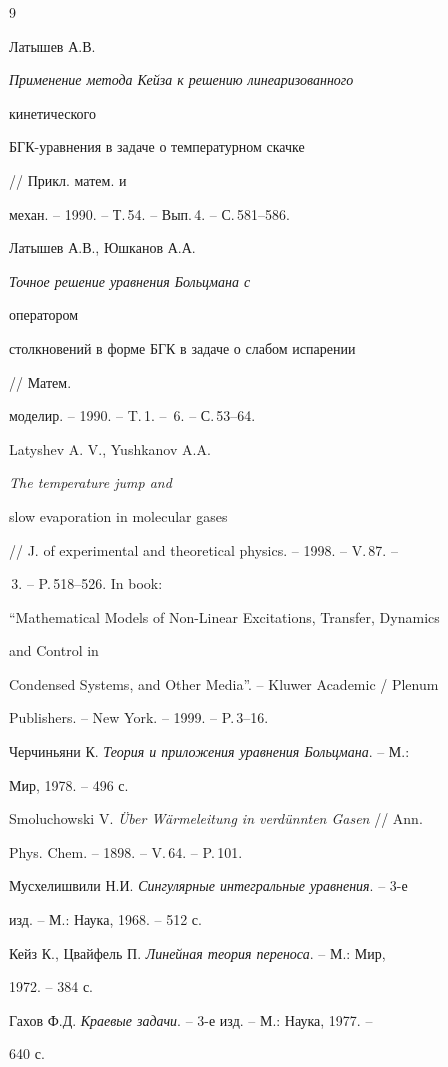 \begin{thebibliography}{9} 


 




Латышев А.В. {\em Применение метода Кейза к решению линеаризованного 


кинетического 


БГК-уравнения в задаче о температурном скачке} // Прикл. матем. и 


механ. -- 1990. -- Т.\,54. -- Вып.\,4. -- С.\,581--586. 




Латышев А.В., Юшканов А.А. {\em Точное решение уравнения Больцмана с 


оператором 


столкновений в форме БГК в задаче о слабом испарении} // Матем. 


моделир. -- 1990. -- T.\,1. -- \No\,6. -- С.\,53--64. 


\bibitem{} 


Latyshev A. V., Yushkanov A.A. {\em The temperature jump and 


slow evaporation in molecular gases} 


// J. of experimental and theoretical physics. -- 1998. -- V.\,87. -- 


\No\,3. -- P.\,518--526. In book: 


``Mathematical Models of Non-Linear Excitations, Transfer, Dynamics 


and Control in 


Condensed Systems, and Other Media''. -- Kluwer Academic / Plenum 


Publishers. -- New York. -- 1999. -- P.\,3--16. 




Черчиньяни К. {\em Теория и приложения уравнения Больцмана}. -- М.: 


Мир, 1978. -- 496 с. 




Smoluchowski V. {\em \"Uber W\"armeleitung in verd\"unnten Gasen} // Ann. 


Phys. Chem. -- 1898. -- V.\,64. -- P.\,101. 




Мусхелишвили Н.И. {\em Сингулярные интегральные уравнения}. -- 3-е 


изд. -- М.: Наука, 1968. -- 512 с. 




Кейз К., Цвайфель П. {\em Линейная теория переноса}. -- М.: Мир, 


1972. -- 384 с. 




Гахов Ф.Д. {\em Краевые задачи}. -- 3-е изд. -- М.: Наука, 1977. -- 


640 с. 


 


\end{thebibliography} 


